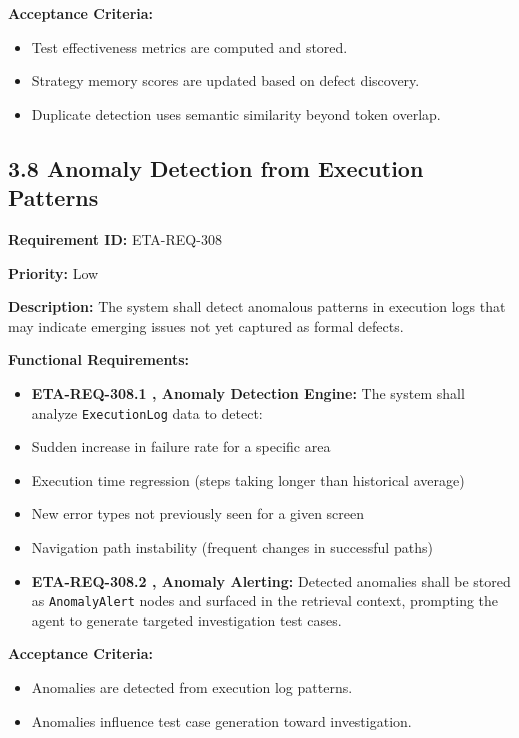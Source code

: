 \textbf{Acceptance Criteria:}
\begin{itemize}[leftmargin=1.4em,itemsep=1pt,topsep=3pt]
  \item Test effectiveness metrics are computed and stored.
  \item Strategy memory scores are updated based on defect discovery.
  \item Duplicate detection uses semantic similarity beyond token overlap.
\end{itemize}

\subsection*{3.8 Anomaly Detection from Execution Patterns}

\textbf{Requirement ID:} ETA-REQ-308

\textbf{Priority:} Low

\textbf{Description:}
The system shall detect anomalous patterns in execution logs that may indicate emerging issues not yet captured as formal defects.

\textbf{Functional Requirements:}

\begin{itemize}[leftmargin=1.4em,itemsep=1pt,topsep=3pt]
  \item \textbf{ETA-REQ-308.1 ,  Anomaly Detection Engine:} The system shall analyze \texttt{ExecutionLog} data to detect:
  \item Sudden increase in failure rate for a specific area
  \item Execution time regression (steps taking longer than historical average)
  \item New error types not previously seen for a given screen
  \item Navigation path instability (frequent changes in successful paths)
\end{itemize}

\begin{itemize}[leftmargin=1.4em,itemsep=1pt,topsep=3pt]
  \item \textbf{ETA-REQ-308.2 ,  Anomaly Alerting:} Detected anomalies shall be stored as \texttt{AnomalyAlert} nodes and surfaced in the retrieval context, prompting the agent to generate targeted investigation test cases.
\end{itemize}

\textbf{Acceptance Criteria:}
\begin{itemize}[leftmargin=1.4em,itemsep=1pt,topsep=3pt]
  \item Anomalies are detected from execution log patterns.
  \item Anomalies influence test case generation toward investigation.
\end{itemize}

